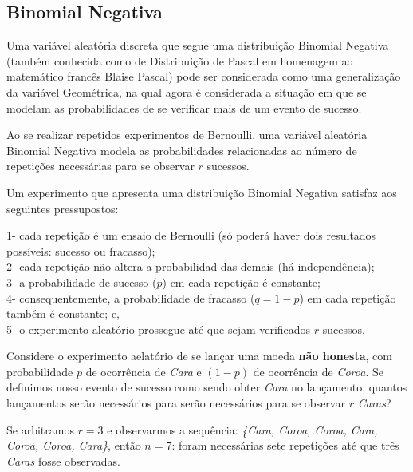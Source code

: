 \documentclass[
]{book}
\begin{document}
\hypertarget{binomial-negativa}{%
\subsection{Binomial Negativa}\label{binomial-negativa}}

\hfill\break

Uma variável aleatória discreta que segue uma distribuição Binomial Negativa (também conhecida como de Distribuição de Pascal em homenagem ao matemático francês Blaise Pascal) pode ser considerada como uma generalização da variável Geométrica, na qual agora é considerada a situação em que se modelam as probabilidades de se verificar mais de um evento de sucesso.

\hfill\break

Ao se realizar repetidos experimentos de Bernoulli, uma variável aleatória Binomial Negativa modela as probabilidades relacionadas ao número de repetições necessárias para se observar \(r\) sucessos.

\hfill\break

Um experimento que apresenta uma distribuição Binomial Negativa satisfaz aos seguintes pressupostos:

\hfill\break

1- cada repetição é um ensaio de Bernoulli (só poderá haver dois resultados possíveis: sucesso ou fracasso);\\
2- cada repetição não altera a probabilidad das demais (há independência);\\
3- a probabilidade de sucesso (\(p\)) em cada repetição é constante;\\
4- consequentemente, a probabilidade de fracasso (\(q=1-p\)) em cada repetição também é constante; e,\\
5- o experimento aleatório prossegue até que sejam verificados \(r\) sucessos.

Considere o experimento aelatório de se lançar uma moeda \textbf{não honesta}, com probabilidade \(p\) de ocorrência de \emph{Cara} e \((1-p)\) de ocorrência de \emph{Coroa}. Se definimos nosso evento de sucesso como sendo obter \emph{Cara} no lançamento, quantos lançamentos serão necessários para serão necessários para se observar \(r\) \emph{Caras}?

\hfill\break

Se arbitramos \(r=3\) e observarmos a sequência: \emph{\{Cara, Coroa, Coroa, Cara, Coroa, Coroa, Cara\}}, então \(n=7\): foram necessárias sete repetições até que três \emph{Caras} fosse observadas.
\end{document}
